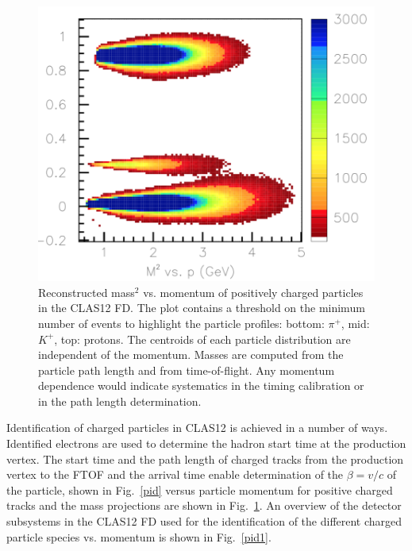 \documentclass[final,3p,twocolumn]{elsarticle}
\begin{document}
\begin{figure}[tbp!]
\centerline{\includegraphics[width=1.0\columnwidth]{FTOF1b_M2-vs-p.png}}
\caption{ Reconstructed mass$^2$ vs. momentum of positively charged particles in the CLAS12 FD. The plot
  contains a threshold on the minimum number of events to highlight the particle profiles: bottom: $\pi^+$, mid:
  $K^+$, top: protons. The centroids of each particle distribution are independent of the momentum. Masses are
  computed from the particle path length and from time-of-flight. Any momentum dependence would indicate
  systematics in the timing calibration or in the path length determination.}
\label{mass2-mom}
\end{figure} 

Identification of charged particles in CLAS12 is achieved in a number of ways. Identified electrons are used to
determine the hadron start time at the production vertex. The start time and the path length of charged
tracks from the production vertex to the FTOF and the arrival time enable determination of the $\beta = v/c$
of the particle, shown in Fig.~\ref{pid} versus particle momentum for positive charged tracks and the mass
projections are shown in Fig.~\ref{mass2-mom}.  An overview of the detector subsystems in the CLAS12 FD
used for the identification of the different charged particle species vs. momentum is shown in Fig.~\ref{pid1}. 
\end{document}
